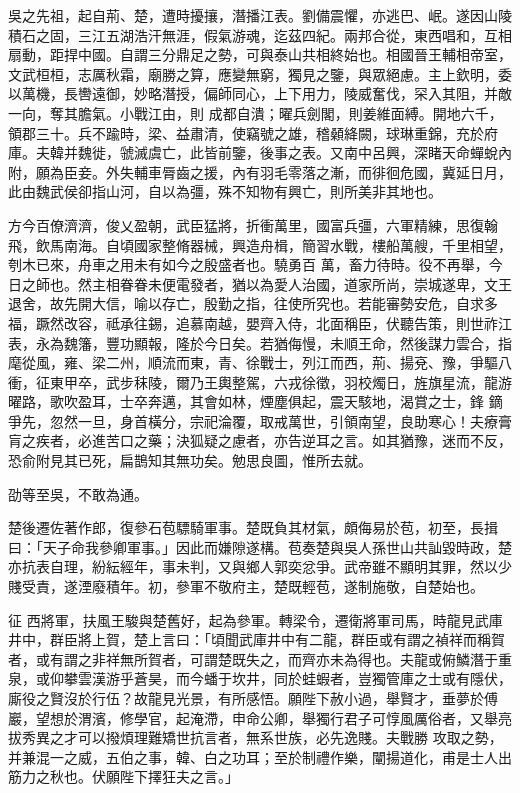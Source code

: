 \begin{pinyinscope}
 吳之先祖，起自荊、楚，遭時擾攘，潛播江表。劉備震懼，亦逃巴、岷。遂因山陵積石之固，三江五湖浩汗無涯，假氣游魂，迄茲四紀。兩邦合從，東西唱和，互相扇動，距捍中國。自謂三分鼎足之勢，可與泰山共相終始也。相國晉王輔相帝室，文武桓桓，志厲秋霜，廟勝之算，應變無窮，獨見之鑒，與眾絕慮。主上欽明，委以萬機，長轡遠御，妙略潛授，偏師同心，上下用力，陵威奮伐，罙入其阻，并敵一向，奪其膽氣。小戰江由，則
 成都自潰；曜兵劍閣，則姜維面縛。開地六千，領郡三十。兵不踰時，梁、益肅清，使竊號之雄，稽顙絳闕，球琳重錦，充於府庫。夫韓并魏徙，虢滅虞亡，此皆前鑒，後事之表。又南中呂興，深睹天命蟬蛻內附，願為臣妾。外失輔車脣齒之援，內有羽毛零落之漸，而徘徊危國，冀延日月，此由魏武侯卻指山河，自以為彊，殊不知物有興亡，則所美非其地也。



 方今百僚濟濟，俊乂盈朝，武臣猛將，折衝萬里，國富兵彊，六軍精練，思復翰飛，飲馬南海。自頃國家整脩器械，興造舟楫，簡習水戰，樓船萬艘，千里相望，刳木已來，舟車之用未有如今之殷盛者也。驍勇百
 萬，畜力待時。役不再舉，今日之師也。然主相眷眷未便電發者，猶以為愛人治國，道家所尚，崇城遂卑，文王退舍，故先開大信，喻以存亡，殷勤之指，往使所究也。若能審勢安危，自求多福，蹶然改容，祗承往錫，追慕南越，嬰齊入侍，北面稱臣，伏聽告策，則世祚江表，永為魏籓，豐功顯報，隆於今日矣。若猶侮慢，未順王命，然後謀力雲合，指麾從風，雍、梁二州，順流而東，青、徐戰士，列江而西，荊、揚兗、豫，爭驅八衝，征東甲卒，武步秣陵，爾乃王輿整駕，六戎徐徵，羽校燭日，旌旗星流，龍游曜路，歌吹盈耳，士卒奔邁，其會如林，煙塵俱起，震天駭地，渴賞之士，鋒
 鏑爭先，忽然一旦，身首橫分，宗祀淪覆，取戒萬世，引領南望，良助寒心！夫療膏肓之疾者，必進苦口之藥；決狐疑之慮者，亦告逆耳之言。如其猶豫，迷而不反，恐俞附見其已死，扁鵲知其無功矣。勉思良圖，惟所去就。



 劭等至吳，不敢為通。



 楚後遷佐著作郎，復參石苞驃騎軍事。楚既負其材氣，頗侮易於苞，初至，長揖曰：「天子命我參卿軍事。」因此而嫌隙遂構。苞奏楚與吳人孫世山共訕毀時政，楚亦抗表自理，紛紜經年，事未判，又與鄉人郭奕忿爭。武帝雖不顯明其罪，然以少賤受責，遂湮廢積年。初，參軍不敬府主，楚既輕苞，遂制施敬，自楚始也。



 征
 西將軍，扶風王駿與楚舊好，起為參軍。轉梁令，遷衛將軍司馬，時龍見武庫井中，群臣將上賀，楚上言曰：「頃聞武庫井中有二龍，群臣或有謂之禎祥而稱賀者，或有謂之非祥無所賀者，可謂楚既失之，而齊亦未為得也。夫龍或俯鱗潛于重泉，或仰攀雲漢游乎蒼昊，而今蟠于坎井，同於蛙蝦者，豈獨管庫之士或有隱伏，廝役之賢沒於行伍？故龍見光景，有所感悟。願陛下赦小過，舉賢才，垂夢於傅巖，望想於渭濱，修學官，起淹滯，申命公卿，舉獨行君子可惇風厲俗者，又舉亮拔秀異之才可以撥煩理難矯世抗言者，無系世族，必先逸賤。夫戰勝
 攻取之勢，并兼混一之威，五伯之事，韓、白之功耳；至於制禮作樂，闡揚道化，甫是士人出筋力之秋也。伏願陛下擇狂夫之言。」




\end{pinyinscope}
